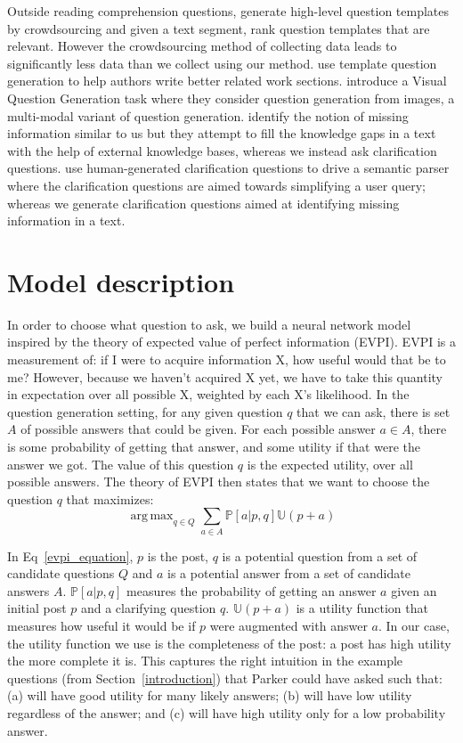 \documentclass[11pt]{report}
\DeclareMathOperator*{\argmax}{arg\,max}
\newcommand\newcite{\citet}	%
\newcommand{\U}{\mathbb{U}}
\begin{document}
Outside reading comprehension questions, \newcite{labutov2015deep} generate high-level question templates by crowdsourcing and given a text segment, rank question templates that are relevant. However the crowdsourcing method of collecting data leads to significantly less data than we collect using our method. \newcite{liu2010automatic} use template question generation to help authors write better related work sections. \newcite{mostafazadeh2016generating} introduce a Visual Question Generation task where they consider question generation from images, a multi-modal variant of question generation. 
\newcite{penas2010filling} identify the notion of missing information similar to us but they attempt to fill the knowledge gaps in a text with the help of external knowledge bases, whereas we instead ask clarification questions. \newcite{artzi2011bootstrapping} use human-generated clarification questions to drive a semantic parser where the clarification questions are aimed towards simplifying a user query; whereas we generate clarification questions aimed at  identifying missing information in a text. 

\section{Model description}\label{model}

In order to choose what question to ask, we build a neural network model inspired by the theory of expected value of perfect information (EVPI). EVPI is a measurement of: if I were to acquire information X, how useful would that be to me? However, because we haven't acquired X yet, we have to take this quantity in expectation over all possible X, weighted by each X's likelihood. In the question generation setting, for any given question $q$ that we can ask, there is set $A$ of possible answers that could be given. For each possible answer $a \in A$, there is some probability of getting that answer, and some utility if that were the answer we got. The value of this question $q$ is the expected utility, over all possible answers. The theory of EVPI then states that we want to choose the question $q$ that maximizes:
\begin{equation}\label{evpi_equation}
\argmax_{q \in Q} \sum_{a \in A} \mathbb{P}[a | p,q] \U(p+a)
\end{equation} 

In Eq~\ref{evpi_equation}, $p$ is the post, $q$ is a potential question from a set of candidate questions $Q$ and $a$ is a potential answer from a set of candidate answers $A$. $\mathbb{P}[a | p,q]$ measures the probability of getting an answer $a$ given an initial post $p$ and a clarifying question $q$. $\U(p+a)$ is a utility function that measures how useful it would be if $p$ were augmented with answer $a$. In our case, the utility function we use is the completeness of the post: a post has high utility the more complete it is. This captures the right intuition in the example questions (from Section~\ref{introduction}) that Parker could have asked such that: \textsf{\small (a)} will have good utility for many likely answers;
\textsf{\small (b)} will have low utility regardless of the answer; and
\textsf{\small (c)} will have high utility only for a low probability answer.
\end{document}
